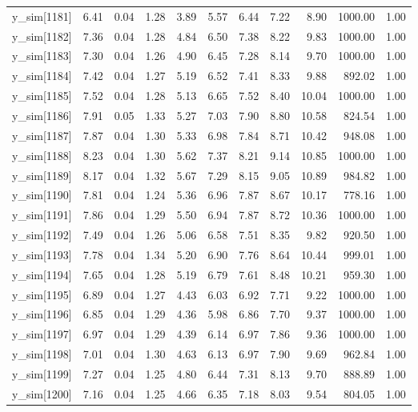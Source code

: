 \begin{table}[ht]
\begin{tabular}{rrrrrrrrrrr}
  y\_sim[1181] & 6.41 & 0.04 & 1.28 & 3.89 & 5.57 & 6.44 & 7.22 & 8.90 & 1000.00 & 1.00 \\ 
  y\_sim[1182] & 7.36 & 0.04 & 1.28 & 4.84 & 6.50 & 7.38 & 8.22 & 9.83 & 1000.00 & 1.00 \\ 
  y\_sim[1183] & 7.30 & 0.04 & 1.26 & 4.90 & 6.45 & 7.28 & 8.14 & 9.70 & 1000.00 & 1.00 \\ 
  y\_sim[1184] & 7.42 & 0.04 & 1.27 & 5.19 & 6.52 & 7.41 & 8.33 & 9.88 & 892.02 & 1.00 \\ 
  y\_sim[1185] & 7.52 & 0.04 & 1.28 & 5.13 & 6.65 & 7.52 & 8.40 & 10.04 & 1000.00 & 1.00 \\ 
  y\_sim[1186] & 7.91 & 0.05 & 1.33 & 5.27 & 7.03 & 7.90 & 8.80 & 10.58 & 824.54 & 1.00 \\ 
  y\_sim[1187] & 7.87 & 0.04 & 1.30 & 5.33 & 6.98 & 7.84 & 8.71 & 10.42 & 948.08 & 1.00 \\ 
  y\_sim[1188] & 8.23 & 0.04 & 1.30 & 5.62 & 7.37 & 8.21 & 9.14 & 10.85 & 1000.00 & 1.00 \\ 
  y\_sim[1189] & 8.17 & 0.04 & 1.32 & 5.67 & 7.29 & 8.15 & 9.05 & 10.89 & 984.82 & 1.00 \\ 
  y\_sim[1190] & 7.81 & 0.04 & 1.24 & 5.36 & 6.96 & 7.87 & 8.67 & 10.17 & 778.16 & 1.00 \\ 
  y\_sim[1191] & 7.86 & 0.04 & 1.29 & 5.50 & 6.94 & 7.87 & 8.72 & 10.36 & 1000.00 & 1.00 \\ 
  y\_sim[1192] & 7.49 & 0.04 & 1.26 & 5.06 & 6.58 & 7.51 & 8.35 & 9.82 & 920.50 & 1.00 \\ 
  y\_sim[1193] & 7.78 & 0.04 & 1.34 & 5.20 & 6.90 & 7.76 & 8.64 & 10.44 & 999.01 & 1.00 \\ 
  y\_sim[1194] & 7.65 & 0.04 & 1.28 & 5.19 & 6.79 & 7.61 & 8.48 & 10.21 & 959.30 & 1.00 \\ 
  y\_sim[1195] & 6.89 & 0.04 & 1.27 & 4.43 & 6.03 & 6.92 & 7.71 & 9.22 & 1000.00 & 1.00 \\ 
  y\_sim[1196] & 6.85 & 0.04 & 1.29 & 4.36 & 5.98 & 6.86 & 7.70 & 9.37 & 1000.00 & 1.00 \\ 
  y\_sim[1197] & 6.97 & 0.04 & 1.29 & 4.39 & 6.14 & 6.97 & 7.86 & 9.36 & 1000.00 & 1.00 \\ 
  y\_sim[1198] & 7.01 & 0.04 & 1.30 & 4.63 & 6.13 & 6.97 & 7.90 & 9.69 & 962.84 & 1.00 \\ 
  y\_sim[1199] & 7.27 & 0.04 & 1.25 & 4.80 & 6.44 & 7.31 & 8.13 & 9.70 & 888.89 & 1.00 \\ 
  y\_sim[1200] & 7.16 & 0.04 & 1.25 & 4.66 & 6.35 & 7.18 & 8.03 & 9.54 & 804.05 & 1.00 \\ 

\end{tabular}
\end{table}
